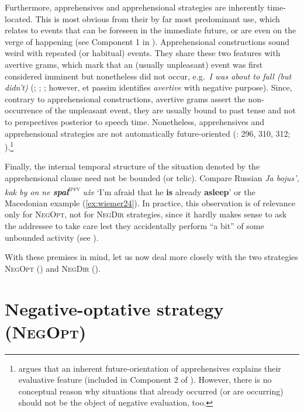 \documentclass[output=paper,colorlinks,citecolor=brown]{langscibook}
\begin{document}
 Furthermore, apprehensives and apprehensional strategies are inherently time-located. This is most obvious from their by far most predominant use, which relates to events that can be foreseen in the immediate future, or are even on the verge of happening (see Component 1 in ). Apprehensional constructions sound weird with repeated (or habitual) events. They share these two features with avertive grams, which mark that an (usually unpleasant) event was first considered imminent but nonetheless did not occur, e.g.\ \textit{I was about to fall (but didn't)} (\citealt{Kuteva1998}; \citealt{kutevaetal2019}; \citealt{Romaine2005}; however, \citealt[130]{Schmidtke-Bode2009} et passim identifies \textit{avertive} with negative purpose). Since, contrary to apprehensional constructions, avertive grams assert the non-occurrence of the unpleasant event, they are usually bound to past tense and not to perspectives posterior to speech time. Nonetheless, apprehensives and apprehensional strategies are not automatically future-oriented (\citealt{lichtenberk1995}: 296, 310, 312; \citealt{Bužarovska2017}).\footnote{\citet[17]{Plungian2004} argues that an inherent future-orientation of apprehensives explains their evaluative feature (included in Component 2 of ). However, there is no conceptual reason why situations that already occurred (or are occurring) should not be the object of negative evaluation, too.}

Finally, the internal temporal structure of the situation denoted by the apprehensional clause need not be bounded (or telic). Compare Russian \textit{Ja bojus', kak by on ne \textbf{spal}}\textsc{\textsuperscript{ipfv}} \textit{uže} `I'm afraid that he \textbf{is} already \textbf{asleep}' or the Macedonian example (\ref{ex:wiemer24}). In practice, this observation is of relevance only for \textsc{NegOpt}, not for \textsc{NegDir} strategies, since it hardly makes sense to ask the addressee to take care lest they accidentally perform ``a bit'' of some unbounded activity (see ).


With these premises in mind, let us now deal more closely with the two strategies \textsc{NegOpt} () and \textsc{NegDir} ().



\section{Negative-optative strategy (\textsc{NegOpt})} \label{sec:negopt}
\end{document}

